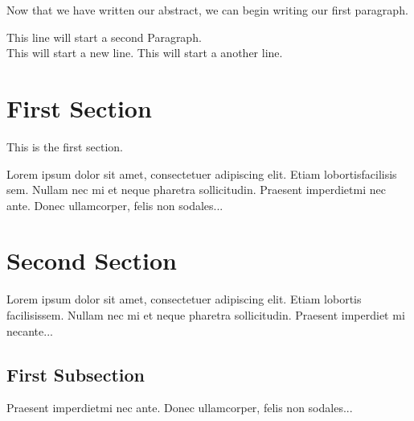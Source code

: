 \documentclass[12pt, letterpaper]{article}
\begin{document}
Now that we have written our abstract, we can begin writing our first paragraph.

This line will start a second Paragraph.
\\ This will start a new line.
\newline This will start a another line.



\section{First Section}
This is the first section.

Lorem ipsum dolor sit amet, consectetuer adipiscing elit. Etiam lobortisfacilisis sem. Nullam nec mi et neque pharetra sollicitudin. Praesent imperdietmi nec ante. Donec ullamcorper, felis non sodales...

\section{Second Section}
Lorem ipsum dolor sit amet, consectetuer adipiscing elit. Etiam lobortis facilisissem. Nullam nec mi et neque pharetra sollicitudin. Praesent imperdiet mi necante... 

\subsection{First Subsection}
Praesent imperdietmi nec ante. Donec ullamcorper, felis non sodales...
\end{document}
